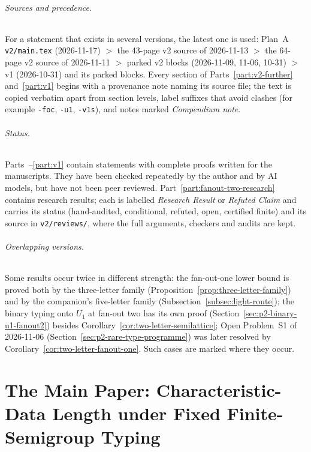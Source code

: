\documentclass[11pt]{article}
\numberwithin{equation}{section}
\theoremstyle{plain}
\theoremstyle{definition}
\theoremstyle{remark}
\theoremstyle{plain}
\begin{document}
\paragraph{Sources and precedence.}
For a statement that exists in several versions, the latest one is used:
Plan~A \texttt{v2/main.tex} (2026-11-17) $>$ the 43-page v2 source of 2026-11-13 $>$ the
64-page v2 source of 2026-11-11 $>$ parked v2 blocks (2026-11-09, 11-06, 10-31) $>$ v1
(2026-10-31) and its parked blocks.  Every section of Parts~\ref{part:v2-further}
and~\ref{part:v1} begins with a provenance note naming its source file; the text is copied
verbatim apart from section levels, label suffixes that avoid clashes (for example
\texttt{-foc}, \texttt{-u1}, \texttt{-v1s}), and notes marked \emph{Compendium note}.

\paragraph{Status.}
Parts~\ref{part:core}--\ref{part:v1} contain statements with complete proofs written for the
manuscripts.  They have been checked repeatedly by the author and by AI models, but have
not been peer reviewed.  Part~\ref{part:fanout-two-research} contains research results; each
is labelled \emph{Research Result} or \emph{Refuted Claim} and carries its status (hand-audited,
conditional, refuted, open, certified finite) and its source in \texttt{v2/reviews/}, where
the full arguments, checkers and audits are kept.

\paragraph{Overlapping versions.}
Some results occur twice in different strength: the fan-out-one lower bound is proved both
by the three-letter family (Proposition~\ref{prop:three-letter-family}) and by the companion's
five-letter family (Subsection~\ref{subsec:light-route}); the binary typing onto $U_1$ at
fan-out two has its own proof (Section~\ref{sec:p2-binary-u1-fanout2}) besides
Corollary~\ref{cor:two-letter-semilattice}; Open Problem~S1 of 2026-11-06
(Section~\ref{sec:p2-rare-type-programme}) was later resolved by
Corollary~\ref{cor:two-letter-fanout-one}.  Such cases are marked where they occur.

\tableofcontents
\clearpage

\part{The Main Paper: Characteristic-Data Length under Fixed Finite-Semigroup Typing}
\label{part:core}
\end{document}
